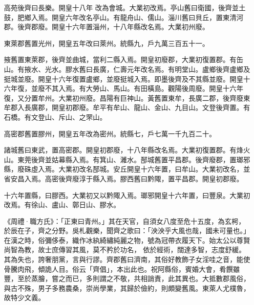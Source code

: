 \begin{pinyinscope}
 高苑後齊曰長樂。開皇十八年
 改為會城。大業初改焉。亭山舊曰衛國，後齊並土鼓，肥鄉入焉。開皇六年改名亭山。有龍舟山、儒山。淄川舊曰貝丘，置東清河郡。後齊郡廢。開皇十六年置淄州，十八年縣改名焉。大業初州廢。



 東萊郡舊置光州，開皇五年改曰萊州。統縣九，戶九萬三百五十一。



 掖舊置東萊郡，後齊並曲城，當利二縣入焉。開皇初廢郡，大業初復置郡。有缶山。有掖水、光水。膠水舊曰長廣，仁壽元年改名焉。有明堂山。盧鄉後齊盧鄉及挺城並廢。開皇十六年復置盧鄉，並廢挺城入焉。即墨後齊及不其縣並廢。開皇十六年復，並廢不其入焉。有大勞山、馬山。有田橫島。觀陽後周廢。開皇十六年復，又分置牟州。大業初州廢。昌陽有巨神山。黃舊置東牟，長廣二郡，後齊廢東牟郡入長廣郡，開皇初郡廢。牟平有牟山、龍山、金山、九目山。文登後齊置。有石橋。有文登山、斥山、之罘山。



 高密郡舊置膠州，開皇五年改為密州。統縣七，戶七萬一千九百二十。



 諸城舊曰東武，置高密郡。開皇初郡廢，十八年縣改名焉。大業初復置郡。有烽火山。東莞後齊並姑幕縣入焉。有箕山、濰水。郚城舊置平昌郡。後齊廢郡，置瑯邪縣，廢硃虛入焉。大業初改名郚城。安丘開皇十六年置，曰牟山。大業初改名，並省安昌入焉。高密後齊廢淳于縣入焉。膠西舊曰黔陬，置平昌郡。開皇初郡廢。



 十六年置縣，曰膠西。大業初又以黔陬入焉。瑯邪開皇十六年置，曰豐泉。大業初改焉。有徐山、盧山、鄣日山、膠水。



 《周禮·職方氏》：「正東曰青州。」其在天官，自須女八度至危十五度，為玄枵，於辰在子，齊之分野。吳札觀樂，聞齊之歌曰：「泱泱乎大風也哉，國未可量也。」在漢之時，俗彌侈泰，織作冰紈綺繡純麗之物，號為冠帶衣履天下。始太公以尊賢尚智為教，故士庶傳習其風，莫不矜於功名，
 依於經術，闊達多智，志度舒緩。其為失也，誇奢朋黨，言與行謬。齊郡舊曰濟南，其俗好教飾子女淫哇之音，能使骨騰肉飛，傾詭人目。俗云「齊倡」，本出此也。祝阿縣俗，賓婚大會，肴饌雖豐，至於蒸膾，嘗之而已，多則謂之不敬，共相誚責，此其異也。大抵數郡風俗，與古不殊，男子多務農桑，崇尚學業，其歸於儉約，則頗變舊風。東萊人尤樸魯，故特少文義。



\end{pinyinscope}
